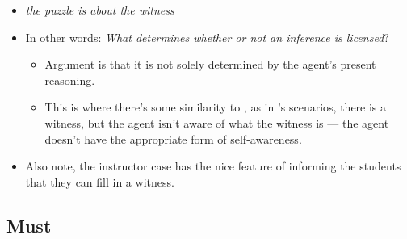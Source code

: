 \documentclass[10pt]{article}
\begin{document}
\begin{itemize}
\begin{itemize}
  \end{itemize}
\item \emph{the puzzle is about the witness}
\item In other words: \emph{What determines whether or not an inference is licensed}?
  \begin{itemize}
  \item Argument is that it is not solely determined by the agent's present reasoning.
  \end{itemize}
  \begin{itemize}
  \item This is where there's some similarity to \citeauthor{Siegel:2019aa}, as in \citeauthor{Siegel:2019aa}'s scenarios, there is a witness, but the agent isn't aware of what the witness is --- the agent doesn't have the appropriate form of self-awareness.
  \end{itemize}
\item Also note, the instructor case has the nice feature of informing the students that they can fill in a witness.
\end{itemize}


\subsection{Must}
\label{sec:must}
\end{document}
